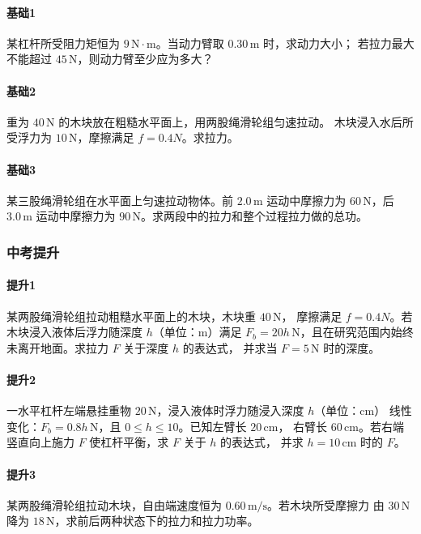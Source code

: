 \documentclass[12pt,a4paper]{ctexart}
\begin{document}
\paragraph{基础1}
某杠杆所受阻力矩恒为 $9\,\mathrm{N\cdot m}$。当动力臂取 $0.30\,\mathrm{m}$ 时，求动力大小；
若拉力最大不能超过 $45\,\mathrm{N}$，则动力臂至少应为多大？

\paragraph{基础2}
重为 $40\,\mathrm{N}$ 的木块放在粗糙水平面上，用两股绳滑轮组匀速拉动。
木块浸入水后所受浮力为 $10\,\mathrm{N}$，摩擦满足 $f=0.4N$。求拉力。

\paragraph{基础3}
某三股绳滑轮组在水平面上匀速拉动物体。前 $2.0\,\mathrm{m}$ 运动中摩擦力为
$60\,\mathrm{N}$，后 $3.0\,\mathrm{m}$ 运动中摩擦力为 $90\,\mathrm{N}$。求两段中的拉力和整个过程拉力做的总功。

\subsubsection*{中考提升}
\paragraph{提升1}
某两股绳滑轮组拉动粗糙水平面上的木块，木块重 $40\,\mathrm{N}$，
摩擦满足 $f=0.4N$。若木块浸入液体后浮力随深度 $h$（单位：m）满足
$F_b=20h\,\mathrm{N}$，且在研究范围内始终未离开地面。求拉力 $F$ 关于深度 $h$ 的表达式，
并求当 $F=5\,\mathrm{N}$ 时的深度。

\paragraph{提升2}
一水平杠杆左端悬挂重物 $20\,\mathrm{N}$，浸入液体时浮力随浸入深度 $h$（单位：cm）
线性变化：$F_b=0.8h\,\mathrm{N}$，且 $0\le h\le 10$。已知左臂长 $20\,\mathrm{cm}$，
右臂长 $60\,\mathrm{cm}$。若右端竖直向上施力 $F$ 使杠杆平衡，求 $F$ 关于 $h$ 的表达式，
并求 $h=10\,\mathrm{cm}$ 时的 $F$。

\paragraph{提升3}
某两股绳滑轮组拉动木块，自由端速度恒为 $0.60\,\mathrm{m/s}$。若木块所受摩擦力
由 $30\,\mathrm{N}$ 降为 $18\,\mathrm{N}$，求前后两种状态下的拉力和拉力功率。
\end{document}
